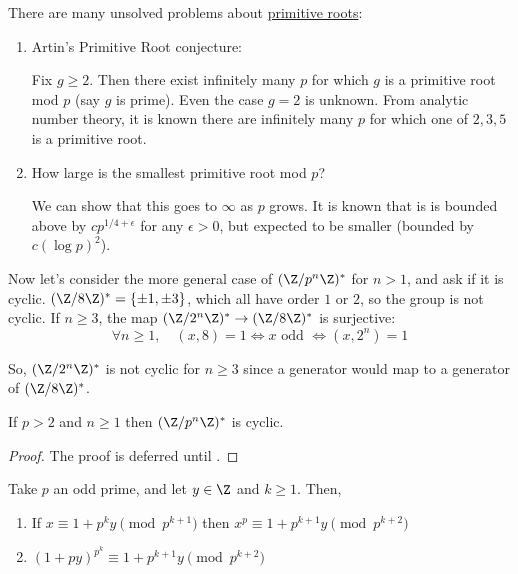 \documentclass{article}
\begin{document}
There are many unsolved problems about \hyperlink{def:primRoot}{primitive roots}:
\begin{enumerate}
    \item Artin's Primitive Root conjecture:

        Fix $g \geq 2$. Then there exist infinitely many $p$ for which $g$ is a primitive root mod $p$ (say $g$ is prime).
        Even the case $g=2$ is unknown.
        From analytic number theory, it is known there are infinitely many $p$ for which one of $2, 3, 5$ is a primitive root.
    \item How large is the smallest primitive root mod $p$?

        We can show that this goes to $\infty$ as $p$ grows.
        It is known that is is bounded above by $c p^{1/4 + \epsilon}$ for any $\epsilon > 0$, but expected to be smaller (bounded by $c (\log p)^2$).
\end{enumerate}

Now let's consider the more general case of $(\Z / p^n \Z)^*$ for $n > 1$, and ask if it is cyclic.
$(\Z / 8 \Z)^* = \{\pm 1, \pm 3\}$, which all have order $1$ or $2$, so the group is not cyclic.  If $n \geq 3$, the map $(\Z/2^n \Z)^* \to (\Z/8 \Z)^*$ is surjective:
\begin{equation*}\forall n \geq 1, \quad (x, 8) = 1 \iff x \text{ odd } \iff (x, 2^n) = 1 \end{equation*}

So, $(\Z/2^n \Z)^*$ is not cyclic for $n \geq 3$ since a generator would map to a generator of $(\Z / 8 \Z)^*$.

\begin{nthm}\label{thm:2.9}
    If $p > 2$ and $n \geq 1$ then $(\Z/p^n \Z)^*$ is cyclic.
\end{nthm}

\begin{proof}
    The proof is deferred until .
\end{proof}

\begin{nlemma}\label{lem:2_10}
    Take $p$ an odd prime, and let $y \in \Z$ and $k \geq 1$. Then,
    \begin{enumerate}[label=(\roman*)]
        \item If $x \equiv 1 + p^k y \pmod{p^{k+1}}$ then $x^p \equiv 1 + p^{k+1} y \pmod{p^{k+2}}$
        \item $(1 + p y)^{p^k} \equiv 1 + p^{k+1} y \pmod{p^{k+2}}$
    \end{enumerate}
\end{nlemma}
\end{document}
